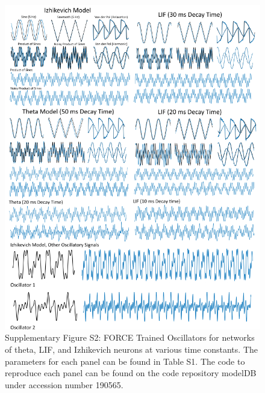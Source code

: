 \documentclass[11pt]{article} %
\begin{document}
\begin{figure}[htp!]
\centering
\includegraphics[scale=0.94]{FFIGS4}
\caption*{Supplementary Figure S2:  FORCE Trained Oscillators for networks of theta, LIF, and Izhikevich neurons at various time constants.  The parameters for each panel can be found in Table S1.  The code to reproduce each panel can be found on the code repository modelDB \cite{modeldb} under accession number 190565.   }
\end{figure}
\end{document}

